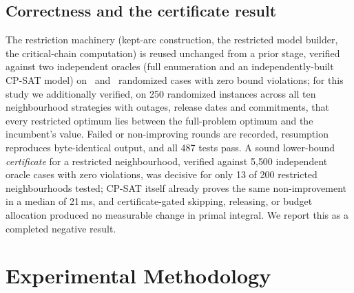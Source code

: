 \documentclass[letterpaper]{article} %
\begin{document}
\subsection{Correctness and the certificate result}
\label{sec:certificate}

The restriction machinery (kept-arc construction, the restricted model builder, the critical-chain computation) is reused unchanged from a prior stage, verified against two independent oracles (full enumeration and an independently-built CP-SAT model) on \OracleEnumCases\ and \OracleCpsatCases\ randomized cases with zero bound violations; for this study we additionally verified, on 250 randomized instances across all ten neighbourhood strategies with outages, release dates and commitments, that every restricted optimum lies between the full-problem optimum and the incumbent's value. Failed or non-improving rounds are recorded, resumption reproduces byte-identical output, and all 487 tests pass. A sound lower-bound \emph{certificate} for a restricted neighbourhood, verified against 5{,}500 independent oracle cases with zero violations, was decisive for only 13 of 200 restricted neighbourhoods tested; CP-SAT itself already proves the same non-improvement in a median of 21\,ms, and certificate-gated skipping, releasing, or budget allocation produced no measurable change in primal integral. We report this as a completed negative result.

\section{Experimental Methodology}
\label{sec:methodology}
\end{document}

